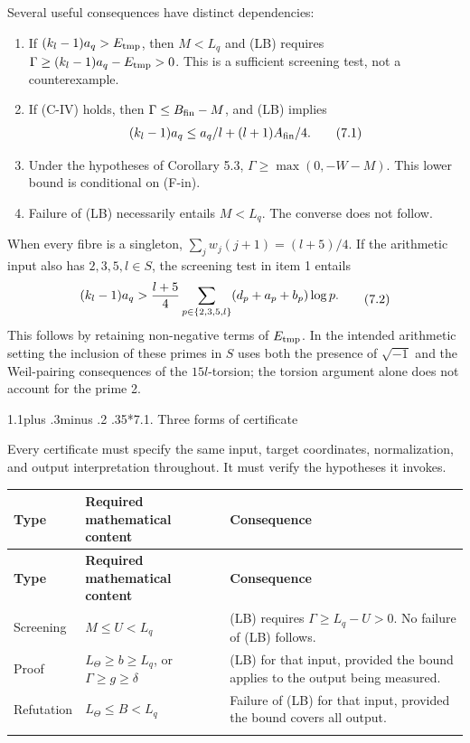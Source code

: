 \documentclass[11pt,a4paper]{amsart}
\makeatletter
\renewcommand\subsection{\@startsection{subsection}{2}{\z@}
{1.1\baselineskip plus .3\baselineskip minus .2\baselineskip}
{.35\baselineskip}{\normalfont\bfseries}}
\makeatother
\begin{document}
Several useful consequences have distinct dependencies:
\begin{enumerate}
\item If $(k_l-1)a_q>E_{\rm tmp}$, then $M<L_q$ and (LB) requires $\Gamma\ge(k_l-1)a_q-E_{\rm tmp}>0$. This is a sufficient screening test, not a counterexample.
\item If (C-IV) holds, then $\Gamma\le B_{\rm fin}-M$, and (LB) implies
\begin{equation}
\begin{gathered}
(k_l-1)a_q\le a_q/l+(l+1)A_{\rm fin}/4.
\end{gathered}
\tag{7.1}\label{eq:7.1}
\end{equation}
\item Under the hypotheses of Corollary 5.3, $\Gamma\ge\max(0,-W-M)$. This lower bound is conditional on (F-in).
\item Failure of (LB) necessarily entails $M<L_q$. The converse does not follow.
\end{enumerate}
When every fibre is a singleton, $\sum_jw_j(j+1)=(l+5)/4$. If the arithmetic input also has $2,3,5,l\in S$, the screening test in item 1 entails
\begin{equation}
\begin{gathered}
(k_l-1)a_q>{l+5\over4}\sum_{p\in\{2,3,5,l\}}(d_p+a_p+b_p)\log p.
\end{gathered}
\tag{7.2}\label{eq:7.2}
\end{equation}
This follows by retaining non-negative terms of $E_{\rm tmp}$. In the intended arithmetic setting the inclusion of these primes in $S$ uses both the presence of $\sqrt{-1}$ and the Weil-pairing consequences of the $15l$-torsion; the torsion argument alone does not account for the prime 2.


\subsection*{7.1. Three forms of certificate}

Every certificate must specify the same input, target coordinates, normalization, and output interpretation throughout. It must verify the hypotheses it invokes.


\Needspace{130pt}
{\footnotesize
\setlength{\tabcolsep}{4pt}
\begin{longtable}{@{}P{0.2\textwidth}P{0.44\textwidth}P{0.29\textwidth}@{}}
\toprule
\textbf{Type} & \textbf{Required mathematical content} & \textbf{Consequence}\\\midrule
\endfirsthead
\toprule
\textbf{Type} & \textbf{Required mathematical content} & \textbf{Consequence}\\\midrule
\endhead
\bottomrule\endfoot
Screening & $M\le U<L_q$ & (LB) requires $\Gamma\ge L_q-U>0$. No failure of (LB) follows.\\\addlinespace[3pt]
Proof & $L_\Theta\ge b\ge L_q$, or $\Gamma\ge g\ge\delta$ & (LB) for that input, provided the bound applies to the output being measured.\\\addlinespace[3pt]
Refutation & $L_\Theta\le B<L_q$ & Failure of (LB) for that input, provided the bound covers all output.\\\addlinespace[3pt]
\end{longtable}
}
\end{document}
